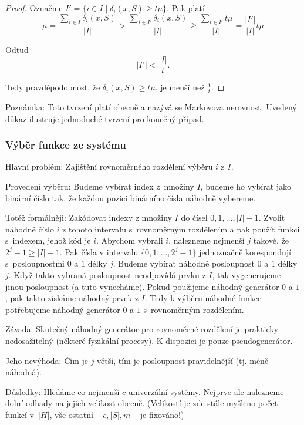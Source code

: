 \documentclass[a4paper,12pt]{article}
\begin{document}
\begin{proof}
Označme $I'=\{i\in I\mid\delta_i(x,S)\ge t\mu \}$. Pak platí
$$\mu =\frac {\sum_{i\in I}\delta_i(x,S)}{|I|}>\frac {\sum_{i\in 
I'}\delta_i(x,S)}{|I|}\ge\frac {\sum_{i\in I'}t\mu}{|I|}=\frac {|
I'|}{|I|}t\mu$$

Odtud
$$|I'|<\frac {|I|}t.$$

Tedy pravděpodobnost, že $\delta_i(x,S)\ge 
t\mu$, je menší 
než $\frac 1t$.
\end{proof}


Poznámka: Toto tvrzení platí obecně a nazývá 
se Markovova nerovnost. Uvedený důkaz 
ilustruje jednoduché tvrzení pro ko\-neč\-ný případ.

\subsubsection{Výběr funkce ze systému}

Hlavní problém: Zajištění rovnoměrného rozdělení 
výběru $i$ z $I$.

Provedení výběru: Budeme vybírat index z~množiny $I$, budeme ho vybírat jako binární číslo tak, že každou pozici binárního čísla náhodně vybereme. 

Totéž formálněji: Zakódovat indexy z množiny $
I$ do 
čísel $0,1,\dots,|I|-1$. Zvolit náhodně číslo $
i$ z tohoto 
intervalu s~rovnoměrným rozdělením a pak použít 
funkci s~indexem, jehož kód je $i$. Abychom vybrali $i$, nalezneme 
nejmenší $j$ takové, že $2^j-1\ge |I|-1$. Pak čísla v 
intervalu $\{0,1,\dots,2^j-1\}$ jednoznačně korespondují s~posloupnostmi $0$ a $1$ délky $j$. Budeme vybírat náhodně 
posloupnost $0$ a $1$ délky $j$. Když takto vybraná posloupnost neodpovídá prvku z $I$, tak vygenerujeme jinou posloupnost (a tuto vynecháme). Pokud použijeme náhodný generátor $0$ a $1$, pak takto získáme náhodný prvek z $I$. Tedy k výběru náhodné funkce potřebujeme  
náhodný generátor $0$ a $1$ s~rovnoměrným rozděle\-ním.

Závada: Skutečný náhodný generátor pro 
rovnoměrné rozděle\-ní je prakticky nedosažitelný 
(některé fyzikální procesy). K dispozici je pouze 
pseudogenerátor. 

Jeho nevýhoda: Čím je $j$ větší, tím je 
posloupnost pravidelnější (tj. méně náhodná). 

Důsledky: Hledáme co nejmenší $c$-univerzální 
systémy. Nejprve ale nalezneme dolní odhady na jejich velikost obecně. (Velikostí je zde stále myšleno počet funkcí v~$|H|$, vše ostatní -- $c, |S|, m$ -- je fixováno!)
\end{document}
